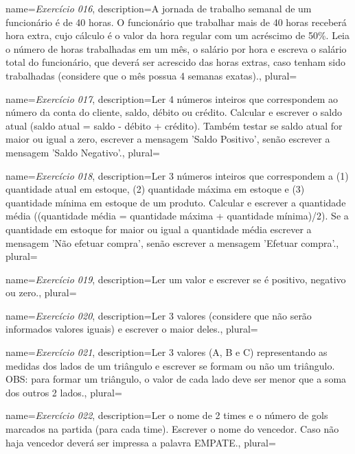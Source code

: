 {
	name={\textit{Exercício 016}},
	description={A jornada de trabalho semanal de um funcionário é de 40 horas. O funcionário que trabalhar mais de 40 horas receberá hora extra, cujo cálculo é o valor da hora regular com um acréscimo de 50\%. Leia o número de horas trabalhadas em um mês, o salário por hora e escreva o salário total do funcionário, que deverá ser acrescido das horas extras, caso tenham sido trabalhadas (considere que o mês possua 4 semanas exatas).},
	plural={}
}



{
	name={\textit{Exercício 017}},
	description={Ler 4 números inteiros que correspondem ao número da conta do cliente, saldo, débito ou crédito. Calcular e escrever o saldo atual (saldo atual = saldo - débito + crédito). Também testar se saldo atual for maior ou igual a zero, escrever a mensagem 'Saldo Positivo', senão escrever a mensagem 'Saldo Negativo'.},
	plural={}
}


{
	name={\textit{Exercício 018}},
	description={Ler 3 números inteiros que correspondem a (1) quantidade atual em estoque, (2) quantidade máxima em estoque e (3) quantidade mínima em estoque de um produto. Calcular e escrever a quantidade média ((quantidade média = quantidade máxima + quantidade mínima)/2). Se a quantidade em estoque for maior ou igual a quantidade média escrever a mensagem 'Não efetuar compra', senão escrever a mensagem 'Efetuar compra'.},
	plural={}
}



{
	name={\textit{Exercício 019}},
	description={Ler um valor e escrever se é positivo, negativo ou zero.},
	plural={}
}



{
	name={\textit{Exercício 020}},
	description={Ler 3 valores (considere que não serão informados valores iguais) e escrever o maior deles.},
	plural={}
}


{
	name={\textit{Exercício 021}},
	description={Ler 3 valores (A, B e C) representando as medidas dos lados de um triângulo e escrever se formam ou não um triângulo. OBS: para formar um triângulo, o valor de cada lado deve ser menor que a soma dos outros 2 lados.},
	plural={}
}


{
	name={\textit{Exercício 022}},
	description={Ler o nome de 2 times e o número de gols marcados na partida (para cada time). Escrever o nome do vencedor. Caso não haja vencedor deverá ser impressa a palavra EMPATE.},
	plural={}
}


